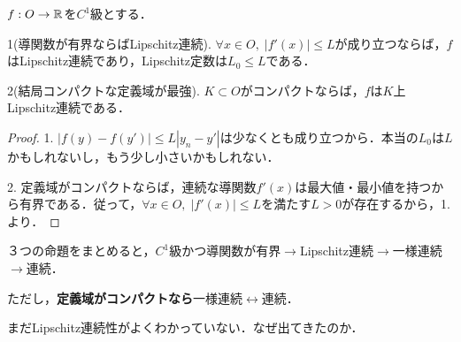 \documentclass[uplatex,dvipdfmx]{jsreport}
\begin{document}
\begin{lemma}[$C^1$級かつ導関数が有界ならばLipschitz連続]\label{lemma-C1-then-Lipschitz}
    $f:O\to\mathbb{R}$を$C^1$級とする．

    1(導関数が有界ならばLipschitz連続). $\forall x\in O,\; |f'(x)|\le L$が成り立つならば，$f$はLipschitz連続であり，Lipschitz定数は$L_0\le L$である．

    2(結局コンパクトな定義域が最強). $K\subset O$がコンパクトならば，$f$は$K$上Lipschitz連続である．
\end{lemma}
\begin{proof}
    1. $|f(y)-f(y')|\le L|y_n-y'|$は少なくとも成り立つから．本当の$L_0$は$L$かもしれないし，もう少し小さいかもしれない．
    
    2. 定義域がコンパクトならば，連続な導関数$f'(x)$は最大値・最小値を持つから有界である．従って，$\forall x\in O,\; |f'(x)|\le L$を満たす$L>0$が存在するから，1.より．
\end{proof}

\begin{screen}
    ３つの命題をまとめると，$C^1$級かつ導関数が有界$\longrightarrow$Lipschitz連続$\longrightarrow$一様連続$\longrightarrow$連続．
    
    ただし，\textbf{定義域がコンパクトなら}一様連続$\longleftrightarrow$連続．

    まだLipschitz連続性がよくわかっていない．なぜ出てきたのか．
\end{screen}
\end{document}

